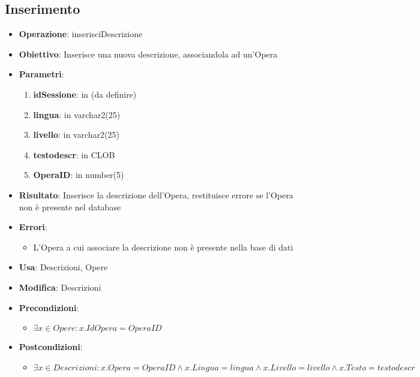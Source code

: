 \subsection{Inserimento}
\begin{itemize}
	\item \textbf{Operazione}: inserisciDescrizione
	\item \textbf{Obiettivo}: Inserisce una nuova descrizione, associandola ad un'Opera
	\item \textbf{Parametri}:
	\begin{enumerate}
		\item \textbf{idSessione}: in (da definire)
		\item \textbf{lingua}: in varchar2(25)
		\item \textbf{livello}: in varchar2(25)
		\item \textbf{testodescr}: in CLOB
		\item \textbf{OperaID}: in number(5)
	\end{enumerate}
	\item \textbf{Risultato}: Inserisce la descrizione dell'Opera, restituisce errore se l'Opera non è presente nel database
	\item \textbf{Errori}: 
	\begin{itemize}
		\item L'Opera a cui associare la descrizione non è presente nella base di dati
	\end{itemize}
	\item \textbf{Usa}: Descrizioni, Opere
	\item \textbf{Modifica}: Descrizioni
	\item \textbf{Precondizioni}:
	\begin{itemize}
		\item $\exists x \in Opere : x.IdOpera = OperaID$
	\end{itemize}
	\item \textbf{Postcondizioni}:
	\begin{itemize}
		\item $\exists x \in Descrizioni : x.Opera = OperaID \land x.Lingua = lingua \land x.Livello = livello \land x.Testo = testodescr$
	\end{itemize}
\end{itemize}

